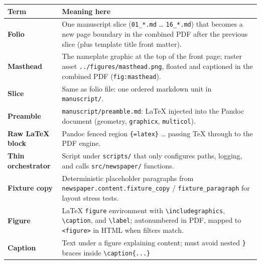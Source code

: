 \documentclass[
]{article}
\newcounter{none} %
\begin{document}
{\def\LTcaptype{none} %
\begin{longtable}[]{@{}
  >{\raggedright\arraybackslash}p{}
  >{\raggedright\arraybackslash}p{}@{}}
\toprule\noalign{}
\begin{minipage}[b]{\linewidth}\raggedright
Term
\end{minipage} & \begin{minipage}[b]{\linewidth}\raggedright
Meaning here
\end{minipage} \\
\midrule\noalign{}
\endhead
\bottomrule\noalign{}
\endlastfoot
\textbf{Folio} & One manuscript slice (\texttt{01\_*.md} \ldots{}
\texttt{16\_*.md}) that becomes a new page boundary in the combined PDF
after the previous slice (plus template title front matter). \\
\textbf{Masthead} & The nameplate graphic at the top of the front page;
raster asset \texttt{../figures/masthead.png}, floated and captioned in
the combined PDF (\texttt{fig:masthead}). \\
\textbf{Slice} & Same as folio file: one ordered markdown unit in
\texttt{manuscript/}. \\
\textbf{Preamble} & \texttt{manuscript/preamble.md}: LaTeX injected into
the Pandoc document (geometry, \texttt{graphicx}, \texttt{multicol}). \\
\textbf{Raw LaTeX block} & Pandoc fenced region
\texttt{\textasciigrave{}\textasciigrave{}\textasciigrave{}\{=latex\}}
\ldots{} \texttt{\textasciigrave{}\textasciigrave{}\textasciigrave{}}
passing TeX through to the PDF engine. \\
\textbf{Thin orchestrator} & Script under \texttt{scripts/} that only
configures paths, logging, and calls \texttt{src/newspaper/}
functions. \\
\textbf{Fixture copy} & Deterministic placeholder paragraphs from
\texttt{newspaper.content.fixture\_copy} / \texttt{fixture\_paragraph}
for layout stress tests. \\
\textbf{Figure} & LaTeX \texttt{figure} environment with
\texttt{\textbackslash{}includegraphics},
\texttt{\textbackslash{}caption}, and \texttt{\textbackslash{}label};
autonumbered in PDF, mapped to \texttt{\textless{}figure\textgreater{}}
in HTML when filters match. \\
\textbf{Caption} & Text under a figure explaining content; must avoid
nested \texttt{\}} braces inside \texttt{\textbackslash{}caption\{...\}}

\end{longtable}}
\end{document}
